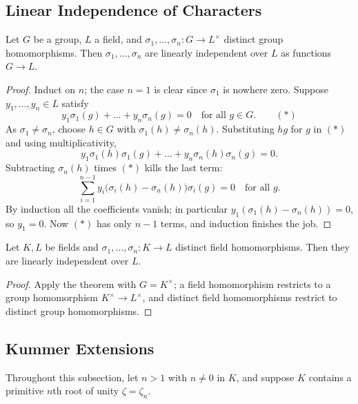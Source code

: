 \subsection{Linear Independence of Characters}

\begin{theorem}\label{thm:linind}
	Let $G$ be a group, $L$ a field, and $\sigma_1, \dots, \sigma_n : G \to L^\times$ distinct group homomorphisms. Then $\sigma_1,\dots,\sigma_n$ are linearly independent over $L$ as functions $G \to L$.
\end{theorem}

\begin{proof}
	Induct on $n$; the case $n = 1$ is clear since $\sigma_1$ is nowhere zero. Suppose $y_1, \dots, y_n \in L$ satisfy
	$$y_1\sigma_1(g) + \dots + y_n\sigma_n(g) = 0 \quad\text{for all } g \in G. \qquad (\ast)$$
	As $\sigma_1 \neq \sigma_n$, choose $h \in G$ with $\sigma_1(h)\neq\sigma_n(h)$. Substituting $hg$ for $g$ in $(\ast)$ and using multiplicativity,
	$$y_1\sigma_1(h)\sigma_1(g)+\dots+y_n\sigma_n(h)\sigma_n(g) = 0.$$
	Subtracting $\sigma_n(h)$ times $(\ast)$ kills the last term:
	$$\sum_{i=1}^{n-1}y_i\big(\sigma_i(h)-\sigma_n(h)\big)\sigma_i(g) = 0 \quad\text{for all }g.$$
	By induction all the coefficients vanish; in particular $y_1(\sigma_1(h)-\sigma_n(h)) = 0$, so $y_1 = 0$. Now $(\ast)$ has only $n-1$ terms, and induction finishes the job.
\end{proof}

\begin{corollary}\label{cor:linind}
	Let $K, L$ be fields and $\sigma_1,\dots,\sigma_n : K \to L$ distinct field homomorphisms. Then they are linearly independent over $L$.
\end{corollary}

\begin{proof}
	Apply the theorem with $G = K^\times$; a field homomorphism restricts to a group homomorphism $K^\times \to L^\times$, and distinct field homomorphisms restrict to distinct group homomorphisms.
\end{proof}

\subsection{Kummer Extensions}

Throughout this subsection, let $n > 1$ with $n \neq 0$ in $K$, and suppose $K$ contains a primitive $n$th root of unity $\zeta = \zeta_n$.

